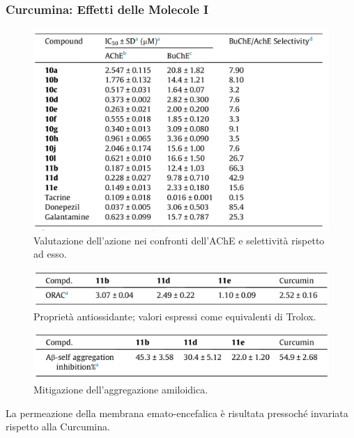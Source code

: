 \documentclass[9pt]{beamer}
\begin{document}
\begin{frame}
	\frametitle{Curcumina: Effetti delle Molecole I}
	
	\begin{figure}
		\includegraphics[scale=0.6]{immagini/tabellacomposti_curcdone.png}
		{\caption*{\footnotesize{Valutazione dell’azione nei confronti dell’AChE e selettività rispetto ad esso.}}}
	\end{figure}
	
	\begin{figure}
		\includegraphics[scale=0.6]{immagini/roi_curcdone.png}
		{\caption*{\footnotesize{Proprietà antiossidante; valori espressi come equivalenti di Trolox.}}}
	\end{figure}
	
	\begin{figure}
		\includegraphics[scale=0.6]{immagini/selfab_curcdone.png}
		{\caption*{\footnotesize{Mitigazione dell'aggregazione amiloidica.}}}
	\end{figure}
	
	La permeazione della membrana emato-encefalica è risultata pressoché invariata rispetto alla Curcumina.
	
\end{frame}
\end{document}
